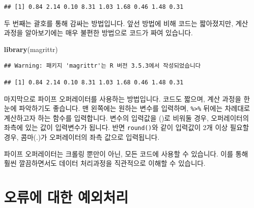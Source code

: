 \documentclass[]{book}
\newenvironment{Shaded}{\begin{snugshade}}{\end{snugshade}}
\newcommand{\DecValTok}[1]{\textcolor[rgb]{0.00,0.00,0.81}{#1}}
\newcommand{\KeywordTok}[1]{\textcolor[rgb]{0.13,0.29,0.53}{\textbf{#1}}}
\newcommand{\NormalTok}[1]{#1}
\newcommand{\OperatorTok}[1]{\textcolor[rgb]{0.81,0.36,0.00}{\textbf{#1}}}
\newcommand{\StringTok}[1]{\textcolor[rgb]{0.31,0.60,0.02}{#1}}
\begin{document}
\begin{verbatim}
## [1] 0.84 2.14 0.10 8.31 1.03 1.68 0.46 1.48 0.31
\end{verbatim}

두 번째는 괄호를 통해 감싸는 방법입니다. 앞선 방법에 비해 코드는 짧아졌지만, 계산 과정을 알아보기에는 매우 불편한 방법으로 코드가 짜여 있습니다.

\begin{Shaded}
\begin{Highlighting}[]
\KeywordTok{library}\NormalTok{(magrittr)}
\end{Highlighting}
\end{Shaded}

\begin{verbatim}
## Warning: 패키지 'magrittr'는 R 버전 3.5.3에서 작성되었습니다
\end{verbatim}

\begin{Shaded}
\end{Shaded}

\begin{verbatim}
## [1] 0.84 2.14 0.10 8.31 1.03 1.68 0.46 1.48 0.31
\end{verbatim}

마지막으로 파이프 오퍼레이터를 사용하는 방법입니다. 코드도 짧으며, 계산 과정을 한눈에 파악하기도 좋습니다. 맨 왼쪽에는 원하는 변수를 입력하며, \texttt{\%\textgreater{}\%} 뒤에는 차례대로 계산하고자 하는 함수를 입력합니다. 변수의 입력값을 ()로 비워둘 경우, 오퍼레이터의 좌측에 있는 값이 입력변수가 됩니다. 반면 \texttt{round()}와 같이 입력값이 2개 이상 필요할 경우, 콤마(.)가 오퍼레이터의 좌측 값으로 입력됩니다.

파이프 오퍼레이터는 크롤링 뿐만이 아닌, 모든 코드에 사용할 수 있습니다. 이를 통해 훨씬 깔끔하면서도 데이터 처리과정을 직관적으로 이해할 수 있습니다.

\hypertarget{section-9}{%
\section{오류에 대한 예외처리}\label{section-9}}
\end{document}
